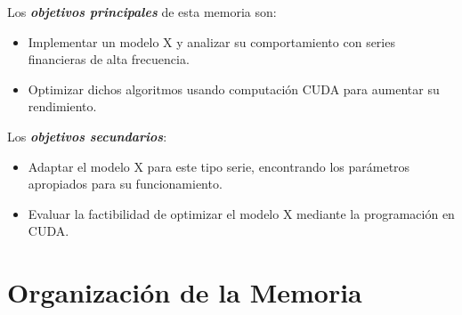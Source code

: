 

Los \emph{\textbf{objetivos principales}} de esta memoria son:
\begin{itemize}
	\item Implementar un modelo X y analizar su comportamiento con
series financieras de alta frecuencia.
	\item Optimizar dichos algoritmos usando computación CUDA para aumentar su rendimiento.
\end{itemize} 

Los \emph{\textbf{objetivos secundarios}}:
\begin{itemize}
	\item Adaptar el modelo X para este tipo serie, encontrando
los parámetros apropiados para su funcionamiento.
	\item Evaluar la factibilidad de optimizar el modelo X mediante la programación en CUDA.
\end{itemize}

\section{Organización de la Memoria}

